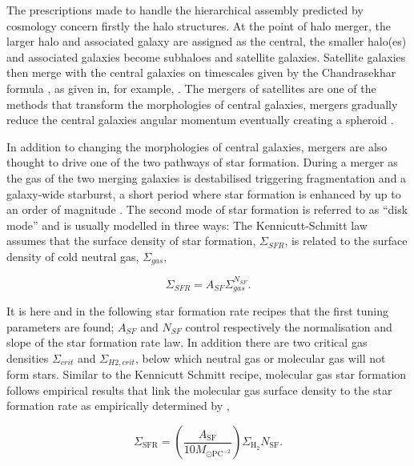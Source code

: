 The prescriptions made to handle the hierarchical assembly predicted by \LCDM cosmology concern firstly the halo structures. At the point of halo merger, the larger halo and associated galaxy are assigned as the central, the smaller halo(es) and associated galaxies become subhaloes and satellite galaxies. Satellite galaxies then merge with the central galaxies on timescales given by the Chandrasekhar formula \citep{Chandrasekhar1943DYNAMICALFRICTION}, as given in, for example, \citet[e.g.][]{Boylan-Kolchin2008}. The mergers of satellites are one of the methods that transform the morphologies of central galaxies, mergers gradually reduce the central galaxies angular momentum eventually creating a spheroid \cite{Hopkins2009HOWMERGERS}. 

In addition to changing the morphologies of central galaxies, mergers are also thought to drive one of the two pathways of star formation. During a merger as the gas of the two merging galaxies is destabilised triggering fragmentation and a galaxy-wide starburst, a short period where star formation is enhanced by up to an order of magnitude \citep{Hopkins2009HOWMERGERS}. The second mode of star formation is referred to as ``disk mode'' and is usually modelled in three ways: The Kennicutt-Schmitt law \citep{KennicuttJr.1998TheGalaxies} assumes that the surface density of star formation, $\Sigma_{SFR}$, is related to the surface density of cold neutral gas, $\Sigma_{gas}$,

\begin{equation}
    \Sigma_{SFR} = A_{SF}\Sigma_{gas}^{N_{SF}}.
\end{equation}

It is here and in the following star formation rate recipes that the first tuning parameters are found; $A_{SF}$ and $N_{SF}$ control respectively the normalisation and slope of the star formation rate law. In addition there are two critical gas densities $\Sigma_{crit}$ and $\Sigma_{H2,crit}$, below which neutral gas or molecular gas will not form stars. Similar to the Kennicutt Schmitt recipe, molecular gas star formation follows empirical results that link the molecular gas surface density to the star formation rate as empirically determined by \citet{Bigiel2008TheResolution},

\begin{equation}
    \Sigma_{\mathrm{SFR}}=\left(\frac{A_{\mathrm{SF}}}{10 M_{\odot \mathrm{PC}^{-2}}}\right) \Sigma_{\mathrm{H}_{2}} N_{\mathrm{SF}}.
\end{equation}

